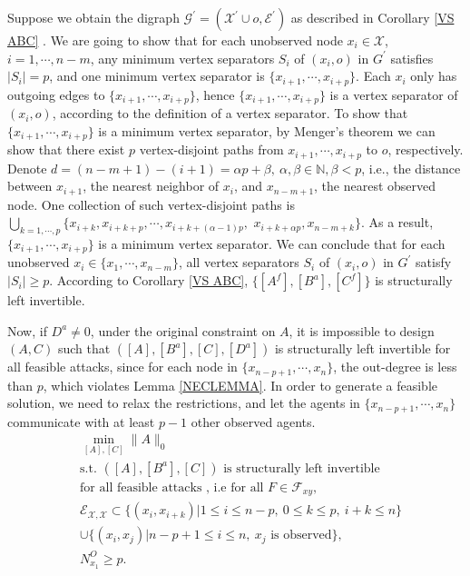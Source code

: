 \documentclass[letterpaper, 10 pt, conference]{ieeeconf}
\begin{document}
 Suppose we obtain the digraph $\mathcal{G}^\prime = (\mathcal{X}^\prime \cup o, \mathcal{E}^\prime)$ as described in Corollary \ref{VS ABC} . We are going to show that for each unobserved node $x_i \in \mathcal{X}$, $i=1,\cdots,n-m$, any minimum vertex separators $S_i$ of $(x_i,o)$ in $G^\prime$ satisfies $|S_i|=p$, and one minimum vertex separator is $\{x_{i+1},\cdots,x_{i+p}\}$. Each $x_i$ only has outgoing edges to $\{x_{i+1},\cdots,x_{i+p}\}$, hence $\{x_{i+1},\cdots,x_{i+p}\}$ is a vertex separator of $(x_i,o)$, according to the definition of a vertex separator. To show that $\{x_{i+1},\cdots,x_{i+p}\}$ is a minimum vertex separator, by Menger's theorem we can show that there exist $p$ vertex-disjoint paths from $x_{i+1},\cdots,x_{i+p}$ to $o$, respectively. Denote $d=(n-m+1)-(i+1)=\alpha p+\beta,~\alpha,\beta \in \mathbb{N}, \beta < p$, i.e., the distance between $x_{i+1}$, the nearest neighbor of $x_i$, and $x_{n-m+1}$, the nearest observed node. One collection of such vertex-disjoint paths is $\bigcup \limits_{k=1,\cdots,p} \{x_{i+k},x_{i+k+p}, \cdots, x_{i+k+(\alpha-1)p},$ $x_{i+k+\alpha p}, x_{n-m+k}\}$. As a result, $\{x_{i+1},\cdots,x_{i+p}\}$ is a minimum vertex separator. We can conclude that for each unobserved $x_i \in \{x_1,\cdots,x_{n-m}\}$, all vertex separators $S_i$ of $(x_i,o)$ in $G^\prime$ satisfy $|S_i| \ge p$. According to Corollary \ref{VS ABC}, $\{[A^f],[B^a],[C^f]\}$ is structurally left invertible.

Now, if $D^a\neq 0$, under the original constraint on $A$, it is impossible to design $(A,C)$ such that $([A],[B^a],[C],[D^a])$ is structurally left invertible for all feasible attacks, since for each node in $\{x_{n-p+1},\cdots,x_n\}$, the out-degree is less than $p$, which violates Lemma \ref{NECLEMMA}. In order to generate a feasible solution, we need to relax the restrictions, and let the agents in $\{x_{n-p+1},\cdots,x_n\}$ communicate with at least $p-1$ other observed agents. 
\begin{align}
 & \underset{[A],[C]}{\min}  \| A \|_0 \label{exprob2} \\
 & \mbox{s.t. } ([A],[B^a],[C]) \mbox{ is structurally left invertible}  \\ \nonumber 
 &\mbox{for all feasible attacks , i.e for all }F \in \mathcal{F}_{xy}, \nonumber \\
 & \mathcal E_{\mathcal X,\mathcal X}\subset \{(x_i,x_{i+k})|1 \le i \le n-p,~ 0 \le k \le p,~i+k\leq n\} \nonumber \\
 & \cup \{(x_i,x_j)| n-p+1 \le i \le n,~ x_j \mbox{ is observed}\}, \nonumber \\
 & N_{x_1}^O \ge p. \nonumber
\end{align}
\end{document}
